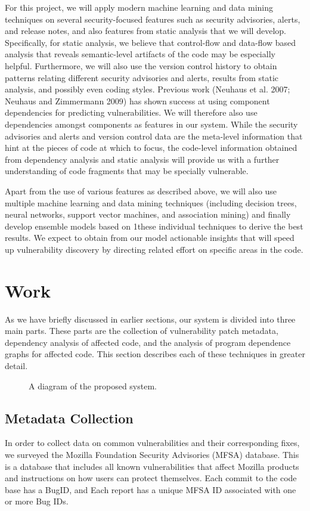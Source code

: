 \documentclass{acm_proc_article-sp}
\begin{document}
For this project, we will apply modern machine learning and data mining 
techniques on several security-focused features such as security advisories, 
alerts, and release notes, and also features from static analysis that we will 
develop. Specifically, for static analysis, we believe that control-flow and 
data-flow based analysis that reveals semantic-level artifacts of the code may 
be especially helpful. Furthermore, we will also use the version control 
history to obtain patterns relating different security advisories and alerts, 
results from static analysis, and possibly even coding styles. Previous work 
(Neuhaus et al. 2007; Neuhaus and Zimmermann 2009) has shown success at using 
component dependencies for predicting vulnerabilities. We will therefore also 
use dependencies amongst components as features in our system. While the 
security advisories and alerts and version control data are the meta-level 
information that hint at the pieces of code at which to focus, the code-level 
information obtained from dependency analysis and static analysis will provide 
us with a further understanding of code fragments that may be specially 
vulnerable.

Apart from the use of various features as described above, we will also use 
multiple machine learning and data mining techniques (including decision trees, 
neural networks, support vector machines, and association mining) and finally 
develop ensemble models based on 1these individual techniques to derive the 
best results. We expect to obtain from our model actionable insights that will 
speed up vulnerability discovery by directing related effort on specific areas 
in the code.

\section{Work}
As we have briefly discussed in earlier sections, our system is divided into 
three main parts. These parts are the collection of vulnerability patch 
metadata, dependency analysis of affected code, and the analysis of program 
dependence graphs for affected code. This section describes each of these 
techniques in greater detail.

\begin{figure*}
\centering
{}
\caption{A diagram of the proposed system.}
\end{figure*}

\subsection{Metadata Collection}
In order to collect data on common vulnerabilities and their corresponding 
fixes, we surveyed the Mozilla Foundation Security Advisories (MFSA) database. 
This is a database that includes all known vulnerabilities that affect Mozilla 
products and instructions on how users can protect themselves. Each commit to 
the code base has a BugID, and Each report has a unique MFSA ID associated with 
one or more Bug IDs.
\end{document}
